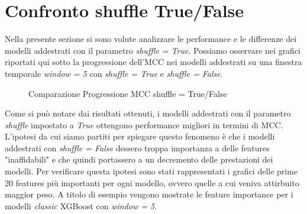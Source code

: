 \section{Confronto shuffle True/False}
Nella presente sezione si sono volute analizzare le performance e le differenze dei modelli addestrati con il parametro \textit{shuffle = True}. Possiamo osservare nei grafici riportati qui sotto la progressione dell'MCC nei modelli addestrati su una finestra temporale \textit{window = 5} con \textit{shuffle = True} e \textit{shuffle = False}.

\begin{figure}[H]
    \centering
    \hfill
    \caption{Comparazione Progressione MCC shuffle = True/False}
    \label{fig:comparazione30}
\end{figure}

Come si pu\`o notare dai risultati ottenuti, i modelli addestrati con il parametro \textit{shuffle} impostato a \textit{True} ottengono performance migliori in termini di MCC. L'ipotesi da cui siamo partiti per spiegare questo fenomeno \`e che i modelli addestrati con \textit{shuffle = False} dessero troppa importanza a delle features "inaffidabili" e che quindi portassero a un decremento delle prestazioni dei modelli. Per verificare questa ipotesi sono stati rappresentati i grafici delle prime 20 features pi\`u importanti per ogni modello, ovvero quelle a cui veniva attirbuito maggior peso. A titolo di esempio vengono mostrate le feature importance per i modelli \textit{classic} XGBoost con \textit{window = 5}.

